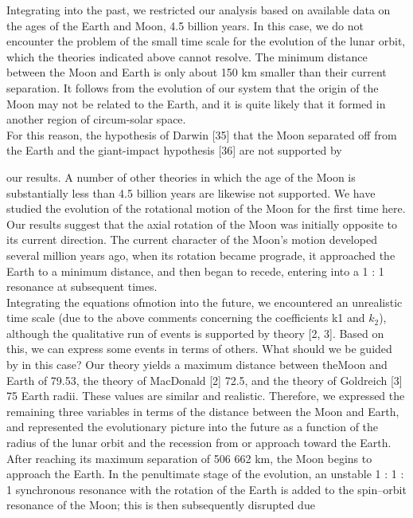 \documentclass[fontsize = 11pt,a4paper]{article}
\begin{document}
\begin{multicols}{2}
\indent Integrating into the past, we restricted our analysis
based on available data on the ages of the Earth
and Moon, 4.5 billion years. In this case, we do not
encounter the problem of the small time scale for the
evolution of the lunar orbit, which the theories indicated
above cannot resolve. The minimum distance
between the Moon and Earth is only about 150 km
smaller than their current separation. It follows from
the evolution of our system that the origin of the Moon
may not be related to the Earth, and it is quite likely
that it formed in another region of circum-solar space. \\
\indent For this reason, the hypothesis of Darwin [35]
that the Moon separated off from the Earth and the
giant-impact hypothesis [36] are not supported by 
\end{multicols}
\pagebreak
\begin{multicols}{2}
our results. A number of other theories in which the
age of the Moon is substantially less than 4.5 billion
years are likewise not supported. We have studied
the evolution of the rotational motion of the Moon
for the first time here. Our results suggest that the
axial rotation of the Moon was initially opposite to
its current direction. The current character of the
Moon’s motion developed several million years ago,
when its rotation became prograde, it approached the
Earth to a minimum distance, and then began to
recede, entering into a 1 : 1 resonance at subsequent
times.\\
\indent Integrating the equations ofmotion into the future,
we encountered an unrealistic time scale (due to the
above comments concerning the coefficients k1 and
$k_2$), although the qualitative run of events is supported
by theory [2, 3]. Based on this, we can express
some events in terms of others. What should we be
guided by in this case? Our theory yields a maximum
distance between theMoon and Earth of 79.53,
the theory of MacDonald [2] 72.5, and the theory of
Goldreich [3] 75 Earth radii. These values are similar
and realistic. Therefore, we expressed the remaining
three variables in terms of the distance between the
Moon and Earth, and represented the evolutionary
picture into the future as a function of the radius of the
lunar orbit and the recession from or approach toward
the Earth. After reaching its maximum separation of
506 662 km, the Moon begins to approach the Earth.
In the penultimate stage of the evolution, an unstable
1 : 1 : 1 synchronous resonance with the rotation
of the Earth is added to the spin–orbit resonance of
the Moon; this is then subsequently disrupted due

\end{multicols}
\end{document}
